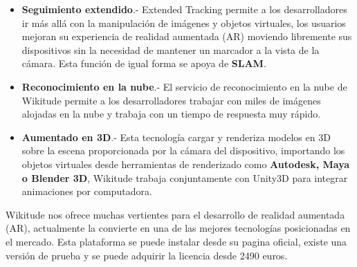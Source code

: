 \begin{itemize}
	\item \textbf{Seguimiento extendido}.- Extended Tracking permite a los desarrolladores ir más allá con la manipulación de imágenes y objetos virtuales, los usuarios mejoran su experiencia de realidad aumentada (AR) moviendo libremente sus dispositivos sin la necesidad de mantener un marcador a la vista de la cámara. Esta función de igual forma se apoya de \textbf{SLAM}. 
	
	\item \textbf{Reconocimiento en la nube}.- El servicio de reconocimiento en la nube de Wikitude permite a los desarrolladores trabajar con miles de imágenes alojadas en la nube y trabaja con un tiempo de respuesta muy rápido.
	
	\item \textbf{Aumentado en 3D}.- Esta tecnología cargar y renderiza modelos en 3D sobre la escena proporcionada por la cámara del dispositivo, importando los objetos virtuales desde herramientas de renderizado como \textbf{Autodesk, Maya o Blender 3D}, Wikitude trabaja conjuntamente con Unity3D para integrar animaciones por computadora.\cite{B16}
	
\end{itemize}
\noindent
Wikitude nos ofrece muchas vertientes para el desarrollo de realidad aumentada (AR), actualmente la convierte en una de las mejores tecnologías posicionadas en el mercado. Esta plataforma se puede instalar desde su pagina oficial, existe una versión de prueba y se puede adquirir la licencia desde 2490 euros.\cite{B16} 

